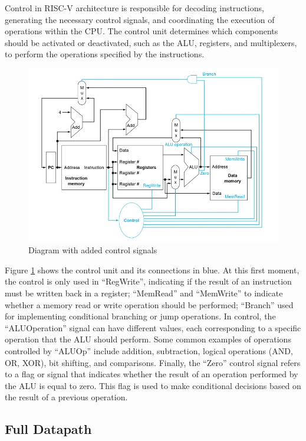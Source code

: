         Control in RISC-V architecture is responsible for decoding instructions, generating the necessary control signals, and coordinating the execution of operations within the CPU. The control unit determines which components should be activated or deactivated, such as the ALU, registers, and multiplexers, to perform the operations specified by the instructions.
        
                \begin{figure}[!h]
        	    \centering
        	    \includegraphics[width= 0.8
        	    \textwidth]{figures/riscv/risc_2.jpg}
                    \caption{\label{risc_2} Diagram with added control signals}
                \end{figure}
                
        Figure \ref{risc_2} shows the control unit and its connections in blue. At this first moment, the control is only used in ``RegWrite'', indicating if the result of an instruction must be written back in a register; ``MemRead'' and ``MemWrite'' to indicate whether a memory read or write operation should be performed; ``Branch'' used for implementing conditional branching or jump operations. In control, the ``ALUOperation'' signal can have different values, each corresponding to a specific operation that the ALU should perform. Some common examples of operations controlled by ``ALUOp'' include addition, subtraction, logical operations (AND, OR, XOR), bit shifting, and comparisons. Finally, the ``Zero'' control signal refers to a flag or signal that indicates whether the result of an operation performed by the ALU is equal to zero. This flag is used to make conditional decisions based on the result of a previous operation.

        \subsection{Full Datapath}

